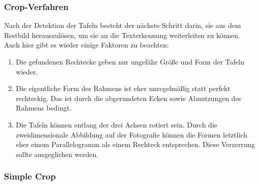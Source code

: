\subsubsection{Crop-Verfahren}

Nach der Detektion der Tafeln besteht der nächste Schritt darin, sie aus dem Restbild herauszulösen, um sie an die Texterkennung weiterleiten zu können. Auch hier gibt es wieder einige Faktoren zu beachten:
\begin{enumerate}
\item Die gefundenen Rechtecke geben nur ungefähr Größe und Form der Tafeln wieder.
\item Die eigentliche Form des Rahmens ist eher unregelmäßig statt perfekt rechteckig. Das ist durch die abgerundeten Ecken sowie Abnutzungen des Rahmens bedingt.
\item Die Tafeln können entlang der drei Achsen rotiert sein. Durch die zweidimensionale Abbildung auf der Fotografie können die Formen letztlich eher einem Parallelogramm als einem Rechteck entsprechen. Diese Verzerrung sollte ausgeglichen werden.
\end{enumerate}


\subsubsection*{Simple Crop}

